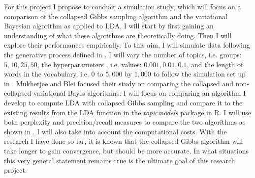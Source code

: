 \documentclass[12pt]{article}
\begin{document}
For this project I propose to conduct a simulation study, which will focus on a comparison of the collapsed Gibbs sampling algorithm and the variational Bayesian algorithm as applied to LDA. I will start by first gaining an understanding of what these algorithms are theoretically doing. Then I will explore their performances empirically. To this aim, I will simulate data following the generative process defined in \cite{lda}. I will vary the number of topics, i.e. groups: $5,10,25,50$, the hyperparameters , i.e. values: $0.001,0.01,0.1$, and the length of words in the vocabulary, i.e. $0$ to $5,000$ by $1,000$ to follow the simulation set up in \cite{BleiComp}. Mukherjee and Blei focused their study on comparing the collapsed and non-collapsed variational Bayes algorithms. I will focus on comparing an algorithm I develop to compute LDA with collapsed Gibbs sampling and compare it to the existing results from the LDA function in the \textit{topicmodels} package in R. I will use both perplexity and precision/recall measures to compare the two algorithms as shown in \cite{Comp}. I will also take into account the computational costs. With the research I have done so far, it is known that the collapsed Gibbs algorithm will take longer to gain convergence, but should be more accurate. In what situations this very general statement remains true is the ultimate goal of this research project. 
\end{document}
